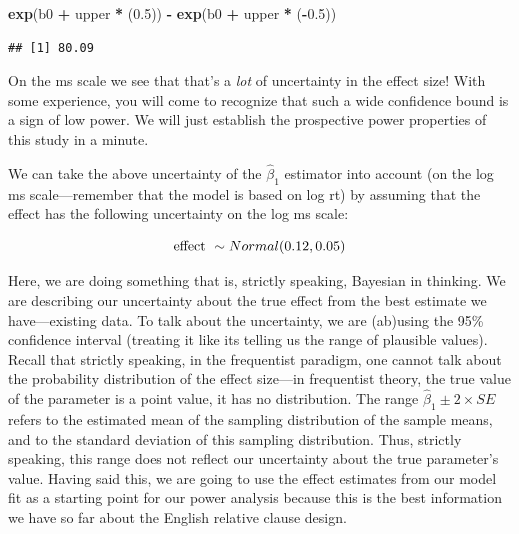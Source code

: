 \documentclass[12pt,]{krantz}
\newenvironment{Shaded}{\begin{snugshade}}{\end{snugshade}}
\newcommand{\FloatTok}[1]{\textcolor[rgb]{0.00,0.00,0.81}{#1}}
\newcommand{\KeywordTok}[1]{\textcolor[rgb]{0.13,0.29,0.53}{\textbf{#1}}}
\newcommand{\NormalTok}[1]{#1}
\newcommand{\OperatorTok}[1]{\textcolor[rgb]{0.81,0.36,0.00}{\textbf{#1}}}
\newcommand{\StringTok}[1]{\textcolor[rgb]{0.31,0.60,0.02}{#1}}
\begin{document}
\begin{Shaded}
\begin{Highlighting}[]
\KeywordTok{exp}\NormalTok{(b0 }\OperatorTok{+}\StringTok{ }\NormalTok{upper }\OperatorTok{*}\StringTok{ }\NormalTok{(}\FloatTok{0.5}\NormalTok{)) }\OperatorTok{-}\StringTok{ }\KeywordTok{exp}\NormalTok{(b0 }\OperatorTok{+}\StringTok{ }\NormalTok{upper }\OperatorTok{*}\StringTok{ }
\StringTok{  }\NormalTok{(}\OperatorTok{-}\FloatTok{0.5}\NormalTok{))}
\end{Highlighting}
\end{Shaded}

\begin{verbatim}
## [1] 80.09
\end{verbatim}

On the ms scale we see that that's a \emph{lot} of uncertainty in the effect size! With some experience, you will come to recognize that such a wide confidence bound is a sign of low power. We will just establish the prospective power properties of this study in a minute.

We can take the above uncertainty of the \(\hat\beta_1\) estimator into account (on the log ms scale---remember that the model is based on log rt) by assuming that the effect has the following uncertainty on the log ms scale:

\begin{equation}
\hbox{effect } \sim Normal(0.12,0.05)
\end{equation}

Here, we are doing something that is, strictly speaking, Bayesian in thinking. We are describing our uncertainty about the true effect from the best estimate we have---existing data. To talk about the uncertainty, we are (ab)using the 95\% confidence interval (treating it like its telling us the range of plausible values). Recall that strictly speaking, in the frequentist paradigm, one cannot talk about the probability distribution of the effect size---in frequentist theory, the true value of the parameter is a point value, it has no distribution. The range \(\hat\beta_1 \pm 2\times SE\) refers to the estimated mean of the sampling distribution of the sample means, and to the standard deviation of this sampling distribution. Thus, strictly speaking, this range does not reflect our uncertainty about the true parameter's value. Having said this, we are going to use the effect estimates from our model fit as a starting point for our power analysis because this is the best information we have so far about the English relative clause design.
\end{document}
